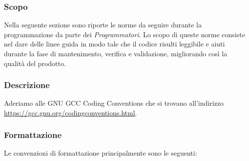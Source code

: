 \documentclass[../NomeDocumento.tex]{subfiles}
\begin{document}
	\subsubsection{Scopo}
	
	Nella seguente sezione sono riporte le norme da seguire durante la programmazione da parte dei \textit{Programmatori}. Lo scopo di queste norme consiste nel dare delle linee guida in modo tale che il codice risulti leggibile e aiuti durante la fase di mantenimento, verifica e validazione, migliorando così la qualità del prodotto.

	\subsubsection{Descrizione}
	
	Aderiamo alle GNU GCC Coding Conventions che si trovano all'indirizzo \url{https://gcc.gnu.org/codingconventions.html}. 
	
	\subsubsection{Formattazione}
	
	Le convenzioni di formattazione principalmente sono le seguenti:
	
\end{document}
